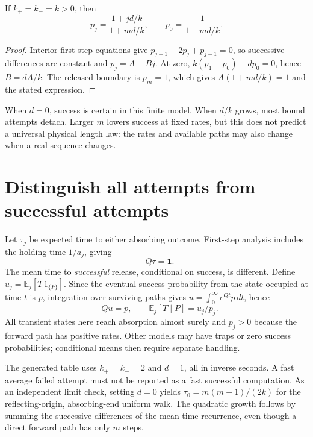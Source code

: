 \begin{proposition}
If $k_+=k_-=k>0$, then
\begin{equation}
 p_j=\frac{1+jd/k}{1+md/k},\qquad p_0=\frac{1}{1+md/k}.
 \label{eq:closed}
\end{equation}
\end{proposition}
\begin{proof}
Interior first-step equations give $p_{j+1}-2p_j+p_{j-1}=0$, so successive
differences are constant and $p_j=A+Bj$. At zero,
$k(p_1-p_0)-dp_0=0$, hence $B=dA/k$. The released boundary is $p_m=1$,
which gives $A(1+md/k)=1$ and the stated expression.
\end{proof}
When $d=0$, success is certain in this finite model. When $d/k$ grows,
most bound attempts detach. Larger $m$ lowers success at fixed rates, but this
does not predict a universal physical length law: the rates and available
paths may also change when a real sequence changes.


\section{Distinguish all attempts from successful attempts}
Let $\tau_j$ be expected time to either absorbing outcome. First-step analysis
includes the holding time $1/a_j$, giving
\begin{equation}
 -Q\tau=\boldsymbol 1.
\end{equation}
The mean time to \emph{successful} release, conditional on success, is different.
Define $u_j=\mathbb E_j[T\,1_{\{P\}}]$. Since the eventual success probability
from the state occupied at time $t$ is $p$, integration over surviving paths
gives $u=\int_0^\infty e^{Qt}p\,dt$, hence
\begin{equation}
 -Qu=p,\qquad \mathbb E_j[T\mid P]=u_j/p_j.
\end{equation}
All transient states here reach absorption almost surely and $p_j>0$ because
the forward path has positive rates. Other models may have traps or zero
success probabilities; conditional means then require separate handling.
\begin{center}\end{center}
The generated table uses $k_+=k_-=2$ and $d=1$, all in inverse seconds.
A fast average failed attempt must not be reported as a fast successful
computation. As an independent limit check, setting $d=0$ yields
$\tau_0=m(m+1)/(2k)$ for the reflecting-origin, absorbing-end uniform walk.
The quadratic growth follows by summing the successive differences of the
mean-time recurrence, even though a direct forward path has only $m$ steps.

